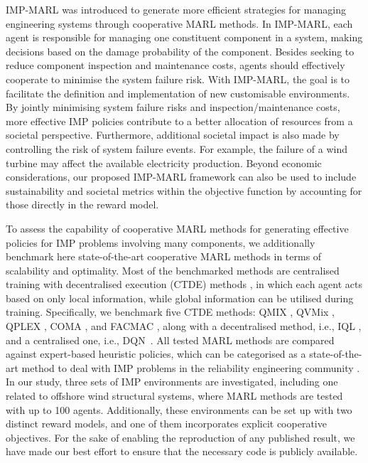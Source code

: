 IMP-MARL was introduced to generate more efficient strategies for managing engineering systems through cooperative MARL methods.
In IMP-MARL, each agent is responsible for managing one constituent component in a system, making decisions based on the damage probability of the component.
Besides seeking to reduce component inspection and maintenance costs, agents should effectively cooperate to minimise the system failure risk.
With IMP-MARL, the goal is to facilitate the definition and implementation of new customisable environments.
By jointly minimising system failure risks and inspection/maintenance costs, more effective IMP policies contribute to a better allocation of resources from a societal perspective.
Furthermore, additional societal impact is also made by controlling the risk of system failure events. 
For example, the failure of a wind turbine may affect the available electricity production. 
Beyond economic considerations, our proposed IMP-MARL framework can also be used to include sustainability and societal metrics within the objective function by accounting for those directly in the reward model.


To assess the capability of cooperative MARL methods for generating effective policies for IMP problems involving many components, we additionally benchmark here state-of-the-art cooperative MARL methods in terms of scalability and optimality. 
Most of the benchmarked methods are centralised training with decentralised execution (CTDE) methods \citep{Oliehoek_2008,KRAEMER201682}, in which each agent acts based on only local information, while global information can be utilised during training.
Specifically, we benchmark five CTDE methods: QMIX \citep{Rashid2018}, QVMix \citep{leroy2020qvmix}, QPLEX \citep{wang2021qplex}, COMA \citep{foerster2017coma}, and FACMAC \citep{peng2021facmac}, along with a decentralised method, i.e., IQL \citep{Tan1993}, and a centralised one, i.e., DQN~\citep{Mnih2015}.
All tested MARL methods are compared against expert-based heuristic policies, which can be categorised as a state-of-the-art method to deal with IMP problems in the reliability engineering community \citep{LuqueDBN2019, morato2022optimal}.
In our study, three sets of IMP environments are investigated, including one related to offshore wind structural systems, where MARL methods are tested with up to 100 agents.
Additionally, these environments can be set up with two distinct reward models, and one of them incorporates explicit cooperative objectives.
For the sake of enabling the reproduction of any published result, we have made our best effort to ensure that the necessary code is publicly available.

